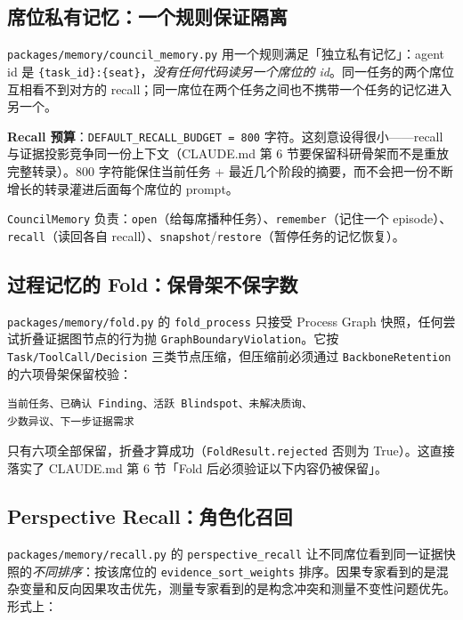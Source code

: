 \subsection{席位私有记忆：一个规则保证隔离}

\texttt{packages/memory/council\_memory.py} 用一个规则满足「独立私有记忆」：agent id 是 \texttt{\{task\_id\}:\{seat\}}，\emph{没有任何代码读另一个席位的 id}。同一任务的两个席位互相看不到对方的 recall；同一席位在两个任务之间也不携带一个任务的记忆进入另一个。

\textbf{Recall 预算}：\texttt{DEFAULT\_RECALL\_BUDGET = 800} 字符。这刻意设得很小——recall 与证据投影竞争同一份上下文（CLAUDE.md 第 6 节要保留科研骨架而不是重放完整转录）。800 字符能保住当前任务 + 最近几个阶段的摘要，而不会把一份不断增长的转录灌进后面每个席位的 prompt。

\texttt{CouncilMemory} 负责：\texttt{open}（给每席播种任务）、\texttt{remember}（记住一个 episode）、\texttt{recall}（读回各自 recall）、\texttt{snapshot}/\texttt{restore}（暂停任务的记忆恢复）。

\subsection{过程记忆的 Fold：保骨架不保字数}

\texttt{packages/memory/fold.py} 的 \texttt{fold\_process} 只接受 Process Graph 快照，任何尝试折叠证据图节点的行为抛 \texttt{GraphBoundaryViolation}。它按 \texttt{Task/ToolCall/Decision} 三类节点压缩，但压缩前必须通过 \texttt{BackboneRetention} 的六项骨架保留校验：

\begin{lstlisting}
当前任务、已确认 Finding、活跃 Blindspot、未解决质询、
少数异议、下一步证据需求
\end{lstlisting}

只有六项全部保留，折叠才算成功（\texttt{FoldResult.rejected} 否则为 True）。这直接落实了 CLAUDE.md 第 6 节「Fold 后必须验证以下内容仍被保留」。

\subsection{Perspective Recall：角色化召回}

\texttt{packages/memory/recall.py} 的 \texttt{perspective\_recall} 让不同席位看到同一证据快照的\emph{不同排序}：按该席位的 \texttt{evidence\_sort\_weights} 排序。因果专家看到的是混杂变量和反向因果攻击优先，测量专家看到的是构念冲突和测量不变性问题优先。形式上：

